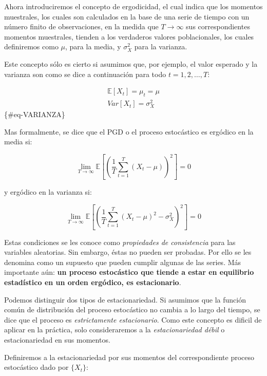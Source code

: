 \documentclass[
  a4paper,
]{article}
\begin{document}
Ahora introduciremos el concepto de ergodicidad, el cual indica que los
momentos muestrales, los cuales son calculados en la base de una serie
de tiempo con un número finito de observaciones, en la medida que
\(T \rightarrow \infty\) sus correspondientes momentos muestrales,
tienden a los verdaderos valores poblacionales, los cuales definiremos
como \(\mu\), para la media, y \(\sigma^2_X\) para la varianza.

Este concepto sólo es cierto si asumimos que, por ejemplo, el valor
esperado y la varianza son como se dice a continuación para todo
\(t = 1, 2, \ldots, T\):

\begin{eqnarray}
    \mathbb{E}[X_t] = \mu_t = \mu \\
    \label{MEDIA}
    Var[X_t] = \sigma^2_X
\end{eqnarray} \{\#eq-VARIANZA\}

Mas formalmente, se dice que el PGD o el proceso estocástico es ergódico
en la media si:

\[
\displaystyle\lim_{T \to \infty}{\mathbb{E} \left[ \left( \frac{1}{T} \sum^{T}_{t = 1} (X_t - \mu) \right) ^2 \right]} = 0
\]

y ergódico en la varianza si:

\[
\displaystyle\lim_{T \to \infty}{\mathbb{E} \left[ \left( \frac{1}{T} \sum^{T}_{t = 1} (X_t - \mu) ^2 - \sigma^2_X \right) ^2 \right]} = 0
\]

Estas condiciones se les conoce como \emph{propiedades de consistencia}
para las variables aleatorias. Sin embargo, éstas no pueden ser
probadas. Por ello se les denomina como un supuesto que pueden cumplir
algunas de las series. Más importante aún: \textbf{un proceso
estocástico que tiende a estar en equilibrio estadístico en un orden
ergódico, es estacionario}.

Podemos distinguir dos tipos de estacionariedad. Si asumimos que la
función común de distribución del proceso estocástico no cambia a lo
largo del tiempo, se dice que el proceso es \emph{estrictamente
estacionario}. Como este concepto es dificil de aplicar en la práctica,
solo consideraremos a la \emph{estacionariedad débil} o estacionariedad
en sus momentos.

Definiremos a la estacionariedad por sus momentos del correspondiente
proceso estocástico dado por \(\{X_t\}\):
\end{document}
